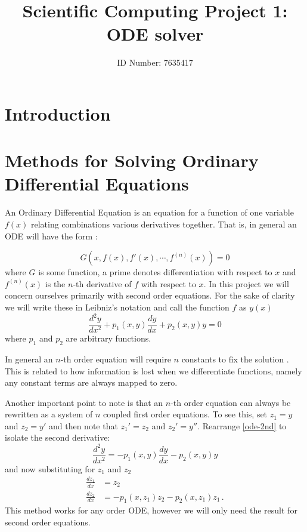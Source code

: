 \documentclass[a4paper,11pt]{report}
\author{ID Number: 7635417}
\date{}
\title{Scientific Computing Project 1: ODE solver}
\begin{document}
\maketitle

\tableofcontents

\chapter*{Introduction}



\chapter{Methods for Solving Ordinary Differential Equations}

An Ordinary Differential Equation is an equation for a function of one variable $f(x)$ relating combinations various derivatives together. That is, in general an ODE will have the form \cite{odes}:

\begin{equation} \label{gen-ode} 
	G\left(x,f(x),f'(x), \cdots, f^{(n)}(x)\right) = 0
\end{equation}
where $G$ is some function, a prime denotes differentiation with respect to $x$ and $f^{(n)}(x)$ is the $n$-th derivative of $f$ with respect to $x$. In this project we will concern ourselves primarily with second order equations.
For the sake of clarity we will write these in Leibniz's notation and call the function $f$ as $y(x)$
\begin{equation} \label{ode-2nd}
	\frac{d^2 y}{dx^2} + p_1 (x,y) \frac{dy}{dx} + p_2 (x,y) y = 0
\end{equation}
where $p_1$ and $p_2$ are arbitrary functions.

In general an $n$-th order equation will require $n$ constants to fix the solution \cite{odes}. This is related to how information is lost when we differentiate functions, namely any constant terms are always mapped to zero.

Another important point to note is that an $n$-th order equation can always be rewritten as a system of $n$ coupled first order equations. To see this, set $z_1 = y$ and $z_2 = y'$ and then note that $z_1' = z_2$ and $z_2' = y''$. Rearrange \ref{ode-2nd} to isolate the second derivative:
\begin{equation} \label{system-example}
	\frac{d^2 y}{dx^2} = - p_1 (x,y) \frac{dy}{dx} - p_2 (x,y) y
\end{equation}
and now substituting for $z_1$ and $z_2$
\begin{equation} \label{system}
	\begin{aligned}
		\frac{d z_1}{dx} &= z_2 \\
		\frac{d z_2}{dx} &= -p_1 (x,z_1) z_2 - p_2(x,z_1) z_1 \, .
	\end{aligned}
\end{equation}
This method works for any order ODE, however we will only need the result for second order equations. 
\end{document}
